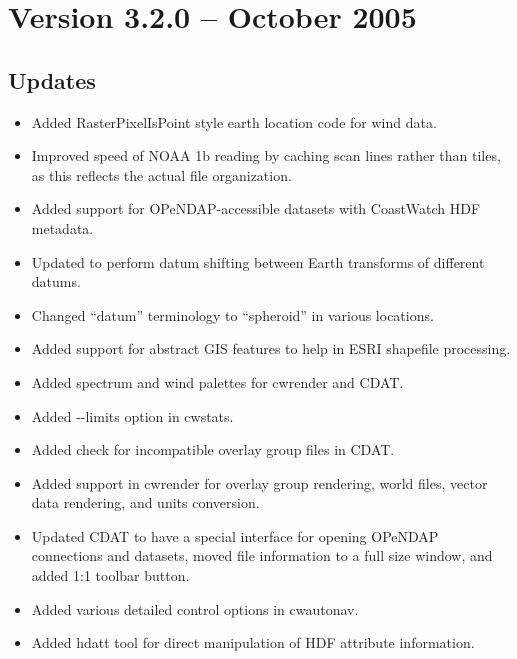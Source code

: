 \section{Version 3.2.0 -- October 2005}

\subsection*{Updates}
\begin{itemize}

  \item Added RasterPixelIsPoint style earth location code for wind
  data.

  \item Improved speed of NOAA 1b reading by caching scan lines rather
  than tiles, as this reflects the actual file organization.

  \item Added support for OPeNDAP-accessible datasets with CoastWatch
  HDF metadata.

  \item Updated to perform datum shifting between Earth
  transforms of different datums.

  \item Changed ``datum'' terminology to ``spheroid'' in various
  locations.

  \item Added support for abstract GIS features to help in ESRI
  shapefile processing.

  \item Added spectrum and wind palettes for cwrender and CDAT.

  \item Added -{-}limits option in cwstats.

  \item Added check for incompatible overlay group files in CDAT.

  \item Added support in cwrender for overlay group rendering, world
  files, vector data rendering, and units conversion.

  \item Updated CDAT to have a special interface for opening OPeNDAP
  connections and datasets, moved file information to a full size
  window, and added 1:1 toolbar button.

  \item Added various detailed control options in cwautonav.

  \item Added hdatt tool for direct manipulation of HDF attribute
  information.

\end{itemize}

